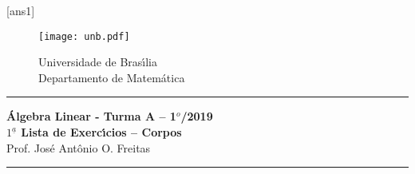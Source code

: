 \documentclass[12pt]{exam}
\newcommand{\vesp}[1]{\vspace{ #1  cm}}
\begin{document}
\pagestyle{empty}

[ans1]

\begin{figure}[h]
        \begin{minipage}[c]{1.7cm}
        \texttt{[image: unb.pdf]}
        \end{minipage}%
        \hspace{0pt}
        \begin{minipage}[c]{4in}
          {Universidade de Bras{\'\i}lia} \\
          {Departamento de Matem{\'a}tica}
\end{minipage}
\end{figure}

\vesp{-0.35} \hrule

\begin{center}
{\Large\bf \'Algebra Linear - Turma A -- 1$^{o}$/2019} \\ \vspace{9pt} {\large\bf
  $1^{\underline{a}}$ Lista de Exerc{\'\i}cios -- Corpos}\\ \vspace{9pt} Prof. Jos{\'e} Ant{\^o}nio O. Freitas
\end{center}
\hrule

\vesp{.6}
\end{document}

